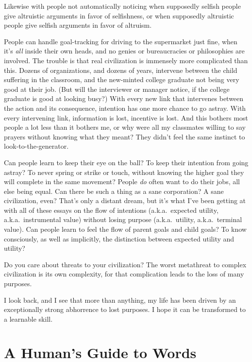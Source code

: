 { Likewise with people not automatically noticing when supposedly
selfish people give altruistic arguments in favor of selfishness, or
when supposedly altruistic people give selfish arguments in favor of
altruism.


 People can handle goal-tracking for driving to the supermarket
just fine, when it's \textit{all} inside their own
heads, and no genies or bureaucracies or philosophies are involved. The
trouble is that real civilization is immensely more complicated than
this. Dozens of organizations, and dozens of years, intervene between
the child suffering in the classroom, and the new-minted college
graduate not being very good at their job. (But will the interviewer or
manager notice, if the college graduate is good at looking busy?) With
every new link that intervenes between the action and its consequence,
intention has one more chance to go astray. With every intervening
link, information is lost, incentive is lost. And this bothers most
people a lot less than it bothers me, or why were all my classmates
willing to say prayers without knowing what they meant? They
didn't feel the same instinct to
look-to-the-generator.


 Can people learn to keep their eye on the ball? To keep their
intention from going astray? To never spring or strike or touch,
without knowing the higher goal they will complete in the same
movement? People \textit{do} often want to do their jobs, all else
being equal. Can there be such a thing as a sane corporation? A sane
civilization, even? That's only a distant dream, but
it's what I've been getting at with all
of these essays on the flow of intentions (a.k.a.~expected utility,
a.k.a.~instrumental value) without losing purpose (a.k.a.~utility,
a.k.a.~terminal value). Can people learn to feel the flow of parent
goals and child goals? To know consciously, as well as implicitly, the
distinction between expected utility and utility?


 Do you care about threats to your civilization? The worst
metathreat to complex civilization is its own complexity, for that
complication leads to the loss of many purposes.


 I look back, and I see that more than anything, my life has been
driven by an exceptionally strong abhorrence to lost purposes. I hope
it can be transformed to a learnable skill.

\myendsectiontext


\bigskip

\chapter{A Human's Guide to Words}

}
